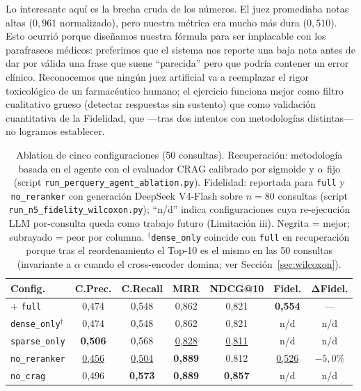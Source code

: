 \documentclass[runningheads]{llncs}
\begin{document}
Lo interesante aqu\'{i} es la brecha cruda de los n\'{u}meros. El juez promediaba notas altas ($0{,}961$ normalizado), pero nuestra m\'{e}trica era mucho m\'{a}s dura ($0{,}510$). Esto ocurri\'{o} porque dise\~{n}amos nuestra f\'{o}rmula para ser implacable con los parafraseos m\'{e}dicos: preferimos que el sistema nos reporte una baja nota antes de dar por v\'{a}lida una frase que suene ``parecida'' pero que podr\'{i}a contener un error cl\'{i}nico. Reconocemos que ning\'{u}n juez artificial va a reemplazar el rigor toxicol\'{o}gico de un farmac\'{e}utico humano; el ejercicio funciona mejor como filtro cualitativo grueso (detectar respuestas sin sustento) que como validaci\'{o}n cuantitativa de la Fidelidad, que —tras dos intentos con metodolog\'{i}as distintas— no logramos establecer.

\begin{table}[!ht]
\centering
\caption{Ablation de cinco configuraciones (50 consultas). Recuperaci\'{o}n: metodolog\'{i}a basada en el agente con el evaluador CRAG calibrado por sigmoide y $\alpha$ fijo (script \texttt{run\_perquery\_agent\_ablation.py}). Fidelidad: reportada para \texttt{full} y \texttt{no\_reranker} con generaci\'{o}n DeepSeek V4-Flash sobre $n{=}80$ consultas (script \texttt{run\_n5\_fidelity\_wilcoxon.py}); ``n/d'' indica configuraciones cuya re-ejecuci\'{o}n LLM por-consulta queda como trabajo futuro (Limitaci\'{o}n iii). Negrita = mejor; subrayado = peor por columna. $^\dagger$\texttt{dense\_only} coincide con \texttt{full} en recuperaci\'{o}n porque tras el reordenamiento el Top-10 es el mismo en las 50 consultas (invariante a $\alpha$ cuando el cross-encoder domina; ver Secci\'{o}n~\ref{sec:wilcoxon}).}
\label{tab:full_results}
\footnotesize
\begin{tabular}{l c c c c c c}
\toprule
\textbf{Config.} & \textbf{C.Prec.} & \textbf{C.Recall} & \textbf{MRR} & \textbf{NDCG@10} & \textbf{Fidel.} & $\boldsymbol{\Delta}$\textbf{Fidel.} \\
\midrule+
\texttt{full}           & 0{,}474 & 0{,}548 & 0{,}862 & 0{,}821 & \textbf{0{,}554} & --- \\
\texttt{dense\_only}$^\dagger$ & 0{,}474 & 0{,}548 & 0{,}862 & 0{,}821 & n/d & n/d \\
\texttt{sparse\_only}   & \textbf{0{,}506} & 0{,}568 & \underline{0{,}828} & \underline{0{,}811} & n/d & n/d \\
\texttt{no\_reranker}   & \underline{0{,}456} & \underline{0{,}504} & \textbf{0{,}889} & 0{,}812 & \underline{0{,}526} & $-5{,}0\%$ \\
\texttt{no\_crag}       & 0{,}496 & \textbf{0{,}573} & \textbf{0{,}889} & \textbf{0{,}857} & n/d & n/d \\
\bottomrule
\end{tabular}
\end{table}
\end{document}
